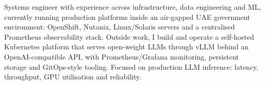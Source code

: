 
\begin{cvparagraph}
	Systems engineer with experience across infrastructure, data engineering and ML, currently running production platforms inside an air-gapped UAE government environment: OpenShift, Nutanix, Linux/Solaris servers and a centralised Prometheus observability stack. Outside work, I build and operate a self-hosted Kubernetes platform that serves open-weight LLMs through vLLM behind an OpenAI-compatible API, with Prometheus/Grafana monitoring, persistent storage and GitOps-style tooling. Focused on production LLM inference: latency, throughput, GPU utilisation and reliability.
\end{cvparagraph}